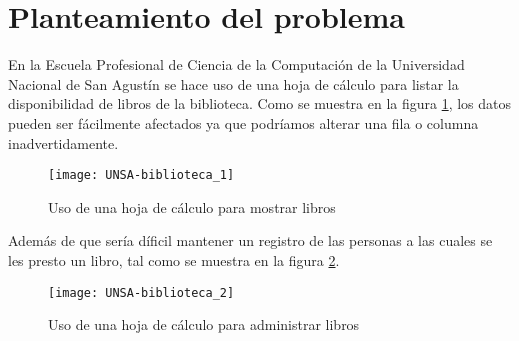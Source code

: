 \section{Planteamiento del problema}
En la Escuela Profesional de Ciencia de la Computación de la Universidad Nacional de San Agustín se hace uso de una hoja de cálculo para listar la disponibilidad de libros de la biblioteca. Como se muestra en la figura \ref{fig:unsa-biblio1}, los datos pueden ser fácilmente afectados ya que podríamos alterar una fila o columna inadvertidamente.
\begin{figure}[H]
  \centering
  \texttt{[image: UNSA-biblioteca\_1]}
  \caption{Uso de una hoja de cálculo para mostrar libros}
  \label{fig:unsa-biblio1}
\end{figure}

Además de que sería díficil mantener un registro de las personas a las cuales se les presto un libro, tal como se muestra en la figura \ref{fig:unsa-biblio2}.
\begin{figure}[H]
  \centering
  \texttt{[image: UNSA-biblioteca\_2]}
  \caption{Uso de una hoja de cálculo para administrar libros}
  \label{fig:unsa-biblio2}
\end{figure}